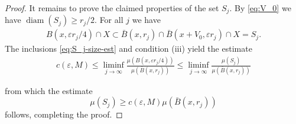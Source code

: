 \documentclass{amsart}
\numberwithin{equation}{section}
\newcommand{\leb}{\mathcal{L}}
\newcommand{\diam}{\operatorname{diam}}
\newcommand{\inv}{^{-1}}
\begin{document}
\begin{proof}
It remains to prove the claimed properties of the set $S_j$. By \eqref{eq:V_0} we have $\diam(S_j)\ge r_j/2$.  
For all $j$ we have
\begin{align}\label{eq:S_j-size-est}
B(x,\varepsilon r_j/4)\cap X\subset  \bar B(x,r_j)\cap \bar B(x+V_0,\varepsilon r_j)\cap X=S_j.
\end{align}
The inclusions \eqref{eq:S_j-size-est} and condition (iii) yield the estimate
\begin{align*}
c(\varepsilon,M)\le \liminf_{j\to \infty}\frac{\mu(B(x,\varepsilon r_j/4))}{\mu(\bar B(x,r_j))}\le\liminf_{j\to\infty}\frac{\mu(S_j)}{\mu(\bar B(x,r_j))}
\end{align*}

from which the estimate
\[
\mu(S_j)\ge c(\varepsilon,M)\mu(\bar B(x,r_j))
\]
follows, completing the proof.
\end{proof}
\end{document}
